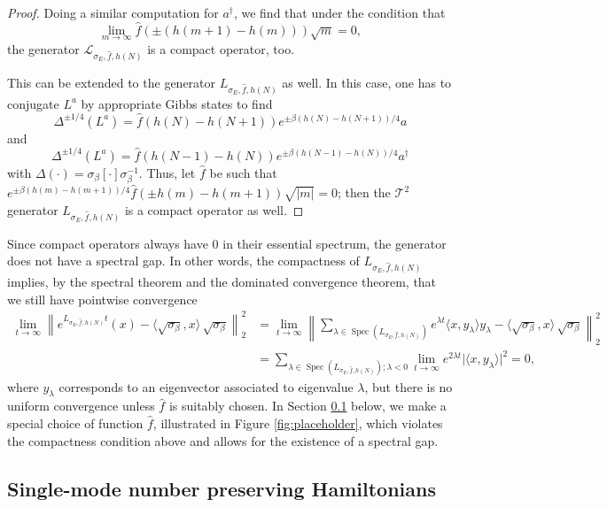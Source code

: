 \documentclass[11pt]{amsart}
\newcommand{\1}{\mathbbm{1}}
\newcommand{\cL}{\mathcal{L}}
\theoremstyle{plain}
\theoremstyle{definition}
\theoremstyle{remark}
\numberwithin{equation}{section}
\begin{document}
\begin{proof}
Doing a similar computation for $a^{\dagger}$, we find that under the condition that \[ \lim_{m \to \infty} \widehat{f}(\pm (h(m+1)-h(m))) \sqrt{m}=0, \]
the generator $\cL_{\sigma_E,\widehat{f},h(N)}$ is a compact operator, too.

\smallskip

This can be extended to the generator $L_{\sigma_E,\widehat{f},h(N)}$ as well. In this case, one has to conjugate $L^a$ by appropriate Gibbs states to find 
\[ \Delta^{\pm 1/4}(L^a)=\widehat{f}(h(N)-h(N+1)) e^{\pm \beta (h(N)-h(N+1))/4} a \]
and 
\[ \Delta^{\pm 1/4}(L^a)=\widehat{f}(h(N-1)-h(N)) e^{\pm \beta (h(N-1)-h(N))/4} a^{\dagger} \]
with $ \Delta(\cdot )=\sigma_\beta[\cdot ]\sigma_\beta^{-1}.$
Thus, let $\widehat{f}$ be such that $e^{\pm \beta (h(m)-h(m+1))/4}\widehat{f}(\pm  h(m)-h(m+1)) \sqrt{|m|}=0$; then the $\mathscr T^2$ generator $L_{\sigma_E,\hat f,h(N)}$ is a compact operator as well.
\end{proof}
\noindent Since compact operators always have $0$ in their essential spectrum, the generator does not have a spectral gap. In other words, the compactness of $L_{\sigma_E,\widehat{f},h(N)}$ implies, by the spectral theorem and the dominated convergence theorem, that we still have pointwise convergence 
\[\begin{split} \lim_{t \to \infty} \left\lVert e^{L_{\sigma_E,\widehat{f},h(N)}t} (x)-\langle \sqrt{\sigma_\beta},x\rangle\,\sqrt{\sigma_\beta}\right\rVert_2^2&=\lim_{t\to\infty}\left\lVert  \sum_{\lambda \in \operatorname{Spec}(L_{\sigma_E,\widehat{f},h(N)})} e^{\lambda t} \langle x,y_{\lambda} \rangle y_{\lambda} - \langle \sqrt{\sigma_\beta},x\rangle\,\sqrt{\sigma_\beta} \right\rVert_2^2\\
&=\sum_{\lambda \in \operatorname{Spec}(L_{\sigma_E,\widehat{f},h(N)});\lambda<0} \lim_{t \to \infty} e^{2\lambda t} \vert \langle x,y_{\lambda} \rangle \vert^2=0,  
\end{split}\]
where $y_\lambda$ corresponds to an eigenvector associated to eigenvalue $\lambda$, but there is no uniform convergence unless $\widehat{f}$ is suitably chosen. In Section \ref{sec:GeneralNumberviaBirthDeath} below, we make a special choice of function $\widehat{f}$, illustrated in Figure \ref{fig:placeholder}, which violates the compactness condition above and allows for the existence of a spectral gap.


\subsection{Single-mode number preserving Hamiltonians}
\label{sec:GeneralNumberviaBirthDeath}
\end{document}
